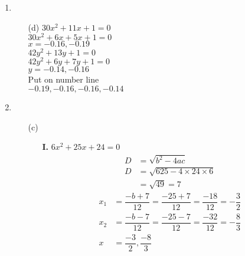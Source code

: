 \begin{multicols}{2}
\begin{enumerate}
\item
\begin{itemize}
\item[(d)] $30x^2 + 11x + 1 = 0$\\
  $30x^2 + 6x + 5x + 1 = 0$\\
  $x = -0.16, -0.19$\\
  $42y^2 + 13y + 1 = 0$\\
  $42y^2 + 6y + 7y + 1 = 0$\\
  $y = -0.14, -0.16$\\
  Put on number line\\
  $-0.19, -0.16, -0.16, -0.14$
\end{itemize}
\item
\begin{itemize}
\item[(c)]
\begin{itemize}
\item[{\bf I.}] $6x^2 + 25x + 24 = 0$\\
\begin{align*}
  D & = \sqrt{b^2 - 4ac}\\
  D & = \sqrt{625 - 4 \times 24 \times 6}\\
  & = \sqrt{49} = 7
\end{align*}
\begin{align*}
  x_1 & = \dfrac{-b + 7}{12} = \dfrac{-25 + 7}{12} = \dfrac{-18}{12} = -\dfrac{3}{2}\\[0.2cm]
  x_2 & = \dfrac{-b - 7}{12} = \dfrac{-25 - 7}{12} = \dfrac{-32}{12} = -\dfrac{8}{3}\\[0.2cm]
  x & = \dfrac{-3}{2}, \dfrac{-8}{3}
\end{align*}


\end{itemize}
\end{itemize}
\end{enumerate}
\end{multicols}
